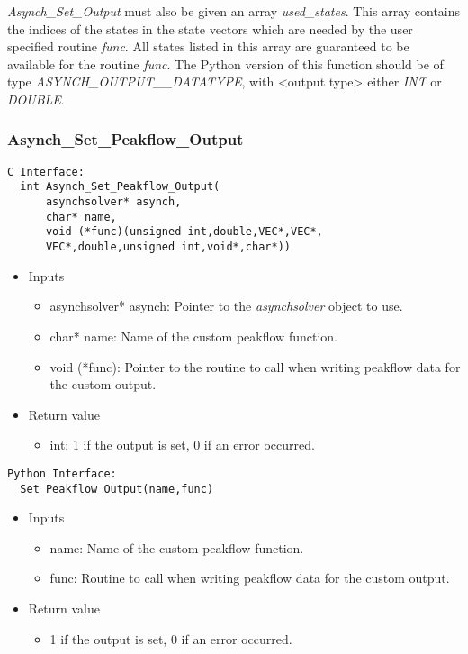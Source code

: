 \documentclass[12pt]{article}
\begin{document}
\emph{Asynch\_Set\_Output} must also be given an array \emph{used\_states}. This array contains the indices of the states in the state vectors which are needed by the user specified routine \emph{func}. All states listed in this array are guaranteed to be available for the routine \emph{func}. The Python version of this function should be of type \emph{ASYNCH\_OUTPUT\_<output type>\_DATATYPE}, with <output type> either \emph{INT} or \emph{DOUBLE}.


\subsubsection{Asynch\_Set\_Peakflow\_Output} \label{sec: asynch_set_peakflow_output}


\begin{lstlisting}[style=CStyle]
  C Interface:
  int Asynch_Set_Peakflow_Output(
      asynchsolver* asynch,
      char* name,
      void (*func)(unsigned int,double,VEC*,VEC*,
	  VEC*,double,unsigned int,void*,char*))
\end{lstlisting}
\begin{itemize}
 \item Inputs
  \begin{itemize}
   \item asynchsolver* asynch: Pointer to the \emph{asynchsolver} object to use.
   \item char* name: Name of the custom peakflow function.
   \item void (*func): Pointer to the routine to call when writing peakflow data for the custom output.
  \end{itemize}
 \item Return value
  \begin{itemize}
   \item int: 1 if the output is set, 0 if an error occurred.
  \end{itemize}
\end{itemize}
\begin{lstlisting}[style=PythonStyle]
  Python Interface:
  Set_Peakflow_Output(name,func)
\end{lstlisting}
\begin{itemize}
 \item Inputs
  \begin{itemize}
   \item name: Name of the custom peakflow function.
   \item func: Routine to call when writing peakflow data for the custom output.
  \end{itemize}
 \item Return value
  \begin{itemize}
   \item 1 if the output is set, 0 if an error occurred.
  \end{itemize}
\end{itemize}
\end{document}
